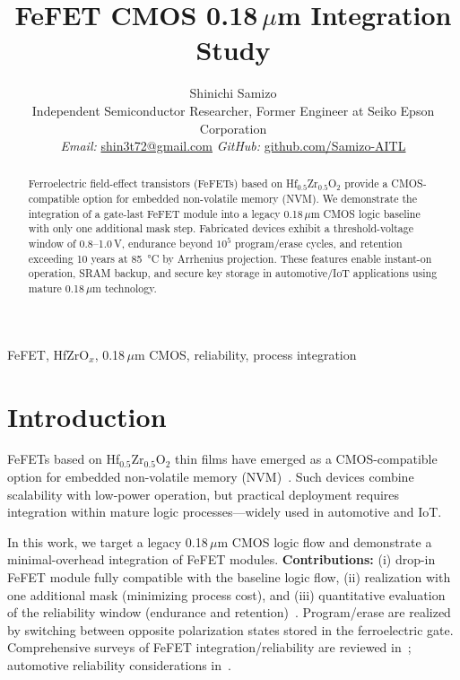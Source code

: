 \documentclass[journal]{IEEEtran}
\newcommand{\HZO}{Hf$_{0.5}$Zr$_{0.5}$O$_2$}
\begin{document}
\title{FeFET CMOS 0.18\,$\mu$m Integration Study}

\author{
  \normalsize Shinichi Samizo\\[-1mm]
  \small Independent Semiconductor Researcher, Former Engineer at Seiko Epson Corporation\\
  \small \textit{Email:} \href{mailto:shin3t72@gmail.com}{shin3t72@gmail.com} \quad
  \textit{GitHub:} \href{https://github.com/Samizo-AITL}{github.com/Samizo-AITL}
}
\maketitle

\begin{abstract}
Ferroelectric field-effect transistors (FeFETs) based on \HZO{} provide a CMOS-compatible option for embedded non-volatile memory (NVM). We demonstrate the integration of a gate-last FeFET module into a legacy 0.18\,$\mu$m CMOS logic baseline with only one additional mask step. Fabricated devices exhibit a threshold-voltage window of 0.8--1.0\,V, endurance beyond $10^5$ program/erase cycles, and retention exceeding 10 years at \SI{85}{\celsius} by Arrhenius projection. These features enable instant-on operation, SRAM backup, and secure key storage in automotive/IoT applications using mature 0.18\,$\mu$m technology.
\end{abstract}

\begin{IEEEkeywords}
FeFET, HfZrO$_x$, 0.18\,$\mu$m CMOS, reliability, process integration
\end{IEEEkeywords}

\section{Introduction}
FeFETs based on \HZO{} thin films have emerged as a CMOS-compatible option for embedded non-volatile memory (NVM)~\cite{Boscke2011,Mueller2012,Schenk2019}. Such devices combine scalability with low-power operation, but practical deployment requires integration within mature logic processes---widely used in automotive and IoT.

In this work, we target a legacy 0.18\,$\mu$m CMOS logic flow and demonstrate a minimal-overhead integration of FeFET modules. \textbf{Contributions:} (i) drop-in FeFET module fully compatible with the baseline logic flow, (ii) realization with one additional mask (minimizing process cost), and (iii) quantitative evaluation of the reliability window (endurance and retention)~\cite{Mueller2015,Park2020}. Program/erase are realized by switching between opposite polarization states stored in the ferroelectric gate. Comprehensive surveys of FeFET integration/reliability are reviewed in~\cite{Khan2015,Polakowski2014}; automotive reliability considerations in~\cite{Nakamura2003}.
\end{document}
